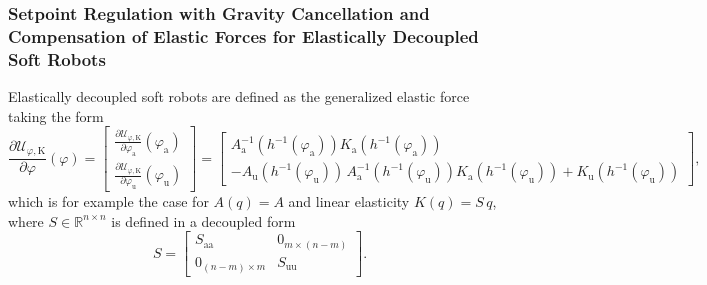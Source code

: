 \subsubsection{Setpoint Regulation with Gravity Cancellation and Compensation of Elastic Forces for Elastically Decoupled Soft Robots}
Elastically decoupled soft robots are defined as the generalized elastic force taking the form~\citep{pustina2025analysis}
\begin{equation}
    \frac{\partial \mathcal{U}_{\varphi,\mathrm{K}}}{\partial \varphi}(\varphi) = \begin{bmatrix}
        \frac{\partial \mathcal{U}_{\varphi,\mathrm{K}}}{\partial \varphi_\mathrm{a}}(\varphi_\mathrm{a})\\
        \frac{\partial \mathcal{U}_{\varphi,\mathrm{K}}}{\partial \varphi_\mathrm{u}}(\varphi_\mathrm{u})
    \end{bmatrix} = \begin{bmatrix}
        A_\mathrm{a}^{-1}(h^{-1}(\varphi_\mathrm{a})) K_\mathrm{a}(h^{-1}(\varphi_\mathrm{a}))\\
        -A_\mathrm{u}(h^{-1}(\varphi_\mathrm{u})) \, A_\mathrm{a}^{-1}(h^{-1}(\varphi_\mathrm{u})) K_\mathrm{a}(h^{-1}(\varphi_\mathrm{u})) + K_\mathrm{u}(h^{-1}(\varphi_\mathrm{u}))
    \end{bmatrix},
\end{equation}
which is for example the case for $A(q) = A$ and linear elasticity $K(q) = S \, q$, where $S \in \mathbb{R}^{n\times n}$ is defined in a decoupled form
\begin{equation}
    S = \begin{bmatrix}
        S_\mathrm{aa} & 0_{m \times (n-m)}\\
        0_{(n-m) \times m} & S_\mathrm{uu}
    \end{bmatrix}.
\end{equation}

